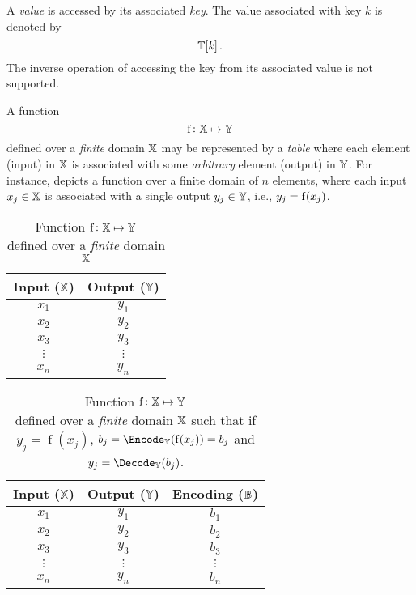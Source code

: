 \documentclass[ ../main.tex]{subfiles}
\begin{document}
A \emph{value} is accessed by its associated \emph{key}. The value associated with key $k$ is denoted by
\begin{equation}
    \mathbb{T}[k]\,.
\end{equation}
The inverse operation of accessing the key from its associated value is not supported.

A function
\begin{equation}
    \operatorname{f} \colon \mathbb{X} \mapsto \mathbb{Y}
\end{equation}
defined over a \emph{finite} domain $\mathbb{X}$ may be represented by a \emph{table} where each element (input) in $\mathbb{X}$ is associated with some \emph{arbitrary} element (output) in $\mathbb{Y}$. For instance,  depicts a function over a finite domain of $n$ elements, where each input $x_j \in \mathbb{X}$ is associated with a single output $y_j \in \mathbb{Y}$, i.e., $y_j = \operatorname{f}(x_j)$.
\begin{table}
\centering
\caption{Function $\operatorname{f} \colon \mathbb{X} \mapsto \mathbb{Y}$\\defined over a \emph{finite} domain $\mathbb{X}$}
\label{tbl:tabfunc}
\begin{tabular}{|c c|} 
\hline
Input ($\mathbb{X}$) & Output ($\mathbb{Y}$)\\
\hline
    $x_1$ & $y_1$\\
    $x_2$ & $y_2$\\
    $x_3$ & $y_3$\\
    $\vdots$ & $\vdots$\\
    $x_n$ & $y_n$\\
\hline
\end{tabular}
\end{table}




\begin{table}
\centering
\caption{Function $\operatorname{f} \colon \mathbb{X} \mapsto \mathbb{Y}$\\defined over a \emph{finite} domain $\mathbb{X}$ such that if $y_j = \operatorname{f}(x_j)$, $b_j = \Encode_{\Y}(\operatorname{f}(x_j)) = b_j$ and $y_j = \Decode_{\Y}(b_j)$.}
\label{tbl:tabfunc}
\begin{tabular}{|c c c|} 
\hline
Input ($\mathbb{X}$) & Output ($\mathbb{Y}$) & Encoding ($\mathbb{B}$)\\
\hline
    $x_1$ & $y_1$ & $b_1$\\
    $x_2$ & $y_2$ & $b_2$\\
    $x_3$ & $y_3$ & $b_3$\\
    $\vdots$ & $\vdots$ & $\vdots$\\
    $x_n$ & $y_n$ & $b_n$\\
\hline
\end{tabular}
\end{table}
\end{document}

